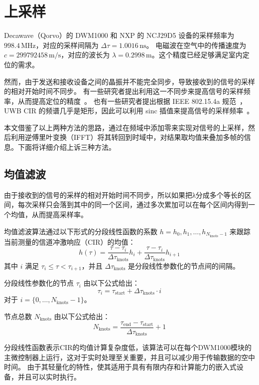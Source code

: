 \section{上采样}
Decawave（Qorvo）的 DWM1000 和 NXP 的 NCJ29D5 设备的采样频率为 \(998.4 \, \text{MHz}\)，对应的采样间隔为 \( \Delta \tau = 1.0016 \, \text{ns}\)。
电磁波在空气中的传播速度为 \(c = 299792458 \, \text{m/s}\)，对应的波长为 \(\lambda = 0.2998 \, \text{m}\)。这个精度已经足够满足室内定位的需求。

然而，由于发送和接收设备之间的晶振并不能完全同步，导致接收到的信号的采样的相对开始时间不同步。
有一些研究者提出利用这一不同步来提高信号的采样频率，从而提高定位的精度~\cite{Ledergerber}。
也有一些研究者提出根据 IEEE 802.15.4a 规范~\cite{IEEE_Std_802.15.4a}， UWB CIR 的频谱几乎是矩形，因此可以利用 sinc 插值来提高信号的采样频率~\cite{MAMPI}。

本文借鉴了以上两种方法的思路，通过在频域中添加零来实现对信号的上采样，然后利用逆傅里叶变换（IFFT）将其转回到时域中，对结果取均值来叠加多帧的信息。下面将详细介绍上诉三种方法。

\subsection{均值滤波}
由于接收到的信号的采样的相对开始时间不同步，所以如果把λ分成多个等长的区间，每次采样只会落到其中的同一个区间，通过多次累加可以在每个区间内得到一个均值，从而提高采样率。

均值滤波算法通过以下形式的分段线性函数的系数 \( h = h_0 , h_1 , \ldots , h_{N_{\text{knots}} -1} \) 来跟踪当前测量的信道冲激响应（CIR）的均值：
\[ h(\tau ) = \frac{\tau  - \tau_i}{\Delta \tau_{\text{knots}}} h_i + \frac{\tau  - \tau_i}{\Delta \tau_{\text{knots}}} h_{i +1} \]
其中 \( i \) 满足 \( \tau_i \leq \tau < \tau_{i+1} \)，并且 \( \Delta \tau_{\text{knots}} \) 是分段线性参数化的节点间的间隔。

分段线性参数化的节点 \( \tau_i \) 由以下公式给出：
\[ \tau_i = \tau_{\text{start}} + \Delta \tau_{\text{knots}} \cdot i \]
对于 \( i = \{0, \ldots , N_{\text{knots}} - 1\} \)。

节点总数 \( N_{\text{knots}} \) 由以下公式给出：
\[ N_{\text{knots}} = \frac{\tau_{\text{end}} - \tau_{\text{start}}}{\Delta \tau_{\text{knots}}} + 1 \]

分段线性函数表示CIR的均值计算复杂度低，该算法可以在每个DWM1000模块的主微控制器上运行，这对于实时处理至关重要，并且可以减少用于传输数据的空中时间。
由于其轻量化的特性，使其适用于具有有限内存和计算能力的嵌入式设备，并且可以实时执行。

